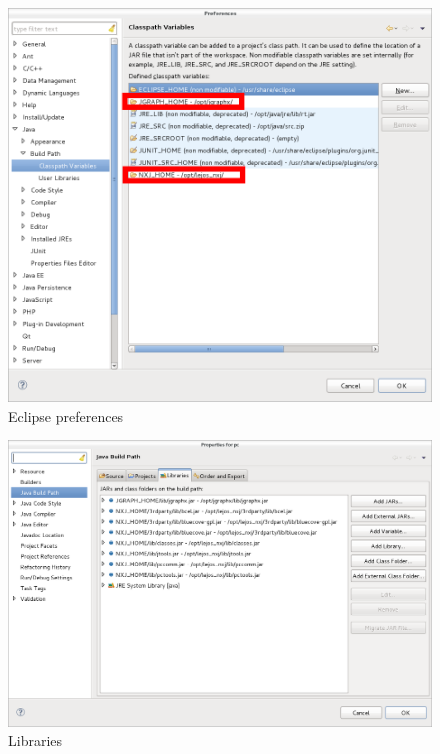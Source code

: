 \documentclass[%
  a4paper,%
  11pt,%
  blue,%
  hyperref	%
  ]{tubsartcl}
\begin{document}
\begin{figure}[!htb]
\begin{center}
\includegraphics[scale=0.45]{graphics_install/eclipse_preferences.png}
\end{center}
\caption{Eclipse preferences}
\label{pic:eclipse_preferences}
\end{figure}

\begin{figure}[!htb]
\begin{center}
\includegraphics[scale=0.45]{graphics_install/libraries.png}
\end{center}
\caption{Libraries}
\label{pic:libraries}
\end{figure}
\end{document}
